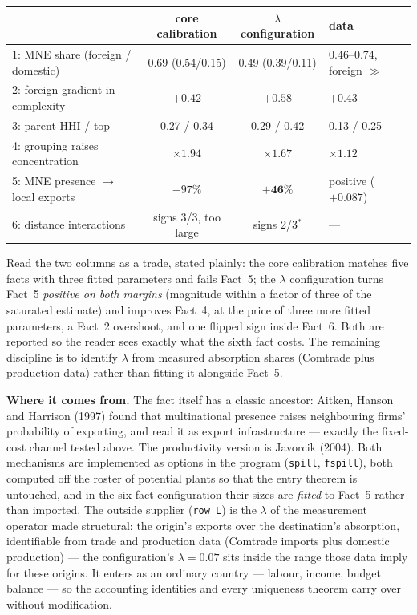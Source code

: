 \documentclass[11pt]{article}
\newcommand{\from}[1]{\smallskip\noindent\textbf{Where it comes from.} #1\smallskip}
\theoremstyle{plain}
\theoremstyle{remark}
\theoremstyle{definition}
\begin{document}
\begin{center}
\small
\begin{tabular}{lccl}
\toprule
 & core calibration & $\lambda$ configuration & data\\
\midrule
1: MNE share (foreign / domestic) & 0.69 (0.54/0.15) & 0.49 (0.39/0.11) & 0.46--0.74, foreign $\gg$\\
2: foreign gradient in complexity & $+0.42$ & $+0.58$ & $+0.43$\\
3: parent HHI / top & 0.27 / 0.34 & 0.29 / 0.42 & 0.13 / 0.25\\
4: grouping raises concentration & $\times1.94$ & $\times1.67$ & $\times1.12$\\
5: MNE presence $\to$ local exports & $-97\%$ & $\mathbf{+46\%}$ & positive ($+0.087$)\\
6: distance interactions & signs 3/3, too large & signs 2/3$^{*}$ & ---\\
\bottomrule
\end{tabular}
\end{center}


\smallskip
\noindent Read the two columns as a trade, stated plainly: the core calibration
matches five facts with three fitted parameters and fails Fact~5; the $\lambda$
configuration turns Fact~5 \emph{positive on both margins} (magnitude within a factor
of three of the saturated estimate) and improves Fact~4, at the price of three more
fitted parameters, a Fact~2 overshoot, and one flipped sign inside Fact~6. Both are
reported so the reader sees exactly what the sixth fact costs. The remaining
discipline is to identify $\lambda$ from measured absorption shares (Comtrade plus
production data) rather than fitting it alongside Fact~5.

\from{The fact itself has a classic ancestor: Aitken, Hanson and Harrison (1997) found
that multinational presence raises neighbouring firms' probability of exporting, and
read it as export infrastructure --- exactly the fixed-cost channel tested above. The
productivity version is Javorcik (2004). Both mechanisms are implemented as options in
the program (\texttt{spill}, \texttt{fspill}), both computed off the roster of
potential plants so that the entry theorem is untouched, and in the six-fact
configuration their sizes are \emph{fitted} to Fact~5 rather than imported. The
outside supplier (\texttt{row\_L}) is the $\lambda$ of the measurement operator made
structural: the origin's exports over the destination's absorption, identifiable from
trade and production data (Comtrade imports plus domestic production) --- the
configuration's $\lambda=0.07$ sits inside the range those data imply for these
origins. It enters as an ordinary country --- labour, income, budget balance --- so
the accounting identities and every uniqueness theorem carry over without
modification.}
\end{document}
